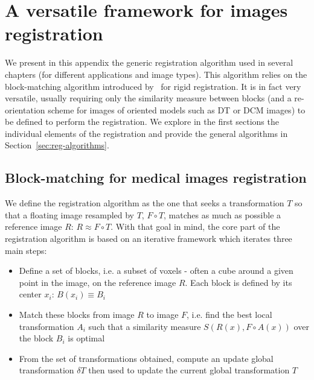 
\chapter{A versatile framework for images registration}
\label{app:registration_framework}

\minitoc

We present in this appendix the generic registration algorithm used in several chapters (for different applications and image types). This algorithm relies on the block-matching algorithm introduced by~\cite{Ourselin_Miccai_2000} for rigid registration. It is in fact very versatile, usually requiring only the similarity measure between blocks (and a re-orientation scheme for images of oriented models such as \ac{DT} or \ac{DCM} images) to be defined to perform the registration. We explore in the first sections the individual elements of the registration and provide the general algorithms in Section~\ref{sec:reg-algorithms}.

\section{Block-matching for medical images registration}

We define the registration algorithm as the one that seeks a transformation $T$ so that a floating image resampled by $T$, $F \circ T$, matches as much as possible a reference image $R$: $R \approx F \circ T$. With that goal in mind, the core part of the registration algorithm is based on an iterative framework which iterates three main steps:

\begin{itemize}
	\item Define a set of blocks, i.e. a subset of voxels - often a cube around a given point in the image, on the reference image $R$. Each block is defined by its center $x_i$: $B(x_i) \equiv B_i$
	\item Match these blocks from image $R$ to image $F$, i.e. find the best local transformation $A_i$ such that a similarity measure $S(R(x), F \circ A(x))$ over the block $B_i$ is optimal
	\item From the set of transformations obtained, compute an update global transformation $\delta T$ then used to update the current global transformation $T$
\end{itemize}

